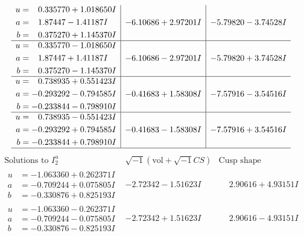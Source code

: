 \documentclass[1p]{elsarticle_modified}
\theoremstyle{definition}
\newcommand{\I}{\sqrt{-1}}
\begin{document}
$$\begin{array}{c|c|c}
\begin{aligned}
u &= \phantom{-}0.335770 + 1.018650 I \\
a &= \phantom{-}1.87447 - 1.41187 I \\
b &= \phantom{-}0.375270 + 1.145370 I\end{aligned}
 & -6.10686 + 2.97201 I & -5.79820 - 3.74528 I \\ \hline\begin{aligned}
u &= \phantom{-}0.335770 - 1.018650 I \\
a &= \phantom{-}1.87447 + 1.41187 I \\
b &= \phantom{-}0.375270 - 1.145370 I\end{aligned}
 & -6.10686 - 2.97201 I & -5.79820 + 3.74528 I \\ \hline\begin{aligned}
u &= \phantom{-}0.738935 + 0.551423 I \\
a &= -0.293292 - 0.794585 I \\
b &= -0.233844 - 0.798910 I\end{aligned}
 & -0.41683 + 1.58308 I & -7.57916 - 3.54516 I \\ \hline\begin{aligned}
u &= \phantom{-}0.738935 - 0.551423 I \\
a &= -0.293292 + 0.794585 I \\
b &= -0.233844 + 0.798910 I\end{aligned}
 & -0.41683 - 1.58308 I & -7.57916 + 3.54516 I\\
 \hline 
 \end{array}$$\newpage$$\begin{array}{c|c|c}  
\text{Solutions to }I^u_{2}& \I (\text{vol} + \sqrt{-1}CS) & \text{Cusp shape}\\
 \hline 
\begin{aligned}
u &= -1.063360 + 0.262371 I \\
a &= -0.709244 + 0.075805 I \\
b &= -0.330876 + 0.825193 I\end{aligned}
 & -2.72342 - 1.51623 I & \phantom{-}2.90616 + 4.93151 I \\ \hline\begin{aligned}
u &= -1.063360 - 0.262371 I \\
a &= -0.709244 - 0.075805 I \\
b &= -0.330876 - 0.825193 I\end{aligned}
 & -2.72342 + 1.51623 I & \phantom{-}2.90616 - 4.93151 I \\ \hline\begin{aligned}

\end{aligned}
\end{array}$$
\end{document}
